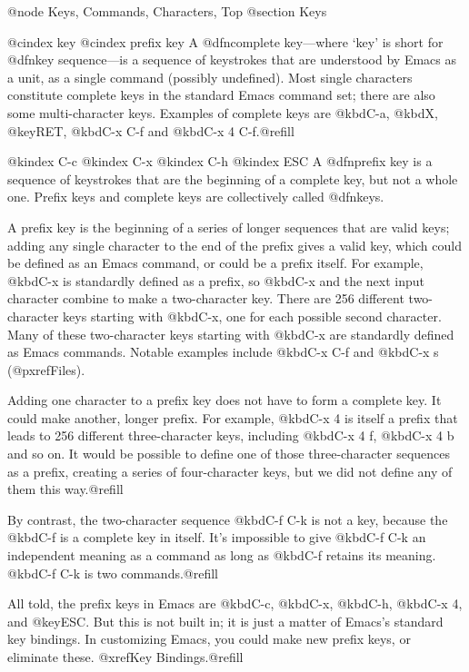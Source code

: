 {{@node Keys, Commands, Characters, Top
@section Keys

@cindex key
@cindex prefix key
  A @dfn{complete key}---where `key' is short for @dfn{key sequence}---is a
sequence of keystrokes that are understood by Emacs as a unit, as a single
command (possibly undefined).  Most single characters constitute complete
keys in the standard Emacs command set; there are also some multi-character
keys.  Examples of complete keys are @kbd{C-a}, @kbd{X}, @key{RET},
@kbd{C-x C-f} and @kbd{C-x 4 C-f}.@refill

@kindex C-c
@kindex C-x
@kindex C-h
@kindex ESC
  A @dfn{prefix key} is a sequence of keystrokes that are the beginning of
a complete key, but not a whole one.  Prefix keys and complete keys are
collectively called @dfn{keys}.

  A prefix key is the beginning of a series of longer sequences that are
valid keys; adding any single character to the end of the prefix gives a
valid key, which could be defined as an Emacs command, or could be a prefix
itself.  For example, @kbd{C-x} is standardly defined as a prefix, so
@kbd{C-x} and the next input character combine to make a two-character key.
There are 256 different two-character keys starting with @kbd{C-x}, one for
each possible second character.  Many of these two-character keys starting
with @kbd{C-x} are standardly defined as Emacs commands.  Notable examples
include @kbd{C-x C-f} and @kbd{C-x s} (@pxref{Files}).

  Adding one character to a prefix key does not have to form a complete
key.  It could make another, longer prefix.  For example, @kbd{C-x 4} is
itself a prefix that leads to 256 different three-character keys, including
@kbd{C-x 4 f}, @kbd{C-x 4 b} and so on.  It would be possible to define one
of those three-character sequences as a prefix, creating a series of
four-character keys, but we did not define any of them this way.@refill

  By contrast, the two-character sequence @kbd{C-f C-k} is not a key,
because the @kbd{C-f} is a complete key in itself.  It's impossible to give
@kbd{C-f C-k} an independent meaning as a command as long as @kbd{C-f}
retains its meaning.  @kbd{C-f C-k} is two commands.@refill

  All told, the prefix keys in Emacs are @kbd{C-c}, @kbd{C-x}, @kbd{C-h},
@kbd{C-x 4}, and @key{ESC}.  But this is not built in; it is just a matter
of Emacs's standard key bindings.  In customizing Emacs, you could make
new prefix keys, or eliminate these.  @xref{Key Bindings}.@refill

}}
